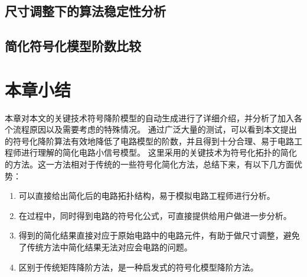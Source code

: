 \subsection{尺寸调整下的算法稳定性分析}
\label{subsec:simp:res:size}

\subsection{简化符号化模型阶数比较}
\label{subsec:simp:res:order}

\section{本章小结}
\label{sec:simp:con}

本章对本文的关键技术符号降阶模型的自动生成进行了详细介绍，并分析了加入各个流程原因以及需要考虑的特殊情况。
通过广泛大量的测试，可以看到本文提出的符号化降阶算法有效地降低了电路模型的阶数，并且得到十分合理、易于电路工程师进行理解的简化电路小信号模型。
这里采用的关键技术为符号化拓扑的简化的方法。这一方法相对于传统的一些符号化简化方法，总结下来，有以下几方面优势：

\begin{enumerate}[label=\emph{\alph*})]
	\item 可以直接给出简化后的电路拓扑结构，易于模拟电路工程师进行分析。
	\item 在过程中，同时得到电路的符号化公式，可直接提供给用户做进一步分析。
	\item 得到的简化结果直接对应于原始电路中的电路元件，有助于做尺寸调整，避免了传统方法中简化结果无法对应会电路的问题。
	\item 区别于传统矩阵降阶方法，是一种启发式的符号化模型降阶方法。
\end{enumerate}